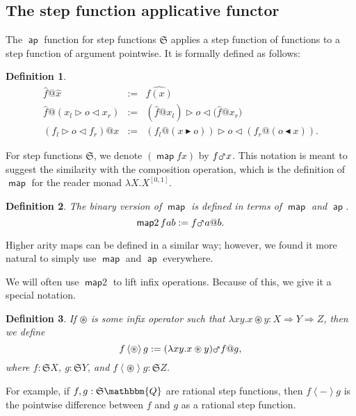 \documentclass{elsarticle}
\makeatletter
\newcommand{\assign}{:=}
\newcommand{\op}[1]{#1}
\newcommand{\tmop}[1]{\ensuremath{\operatorname{#1}}}
\newtheorem{definition}{Definition}
\newcommand{\defEq}{\ensuremath{\assign}}
\newcommand{\pure}[1]{\ensuremath{\widehat{#1}}}
\newcommand{\app}{@}
\newcommand{\Map}{\ensuremath{\mars}}
\newcommand{\maptwo}[1]{\ensuremath{\left\langle #1 \right\rangle}}
\newcommand{\SF}{\ensuremath{\mathfrak{S}}}
\newcommand{\glue}[3]{\ensuremath{#1 \vartriangleright #2 \vartriangleleft #3}}
\newcommand{\splitl}[2]{\ensuremath{#1 \blacktriangleright #2}}
\newcommand{\splitr}[2]{\ensuremath{#2 \blacktriangleleft #1}}
\makeatother
\begin{document}
\subsection{The step function applicative functor}\label{ss:SFasAF}The
$\tmop{\mathsf{ap}}$ function for
step functions $\mathfrak{S}$ applies a step function of functions to a step
function of argument pointwise. It is formally defined as follows:
\begin{definition}
  \begin{eqnarray*}
    \pure{f} \app \pure{x} & \defEq & \pure{f (x)}\\
    \pure{f} \app ( \glue{x_l}{o}{x_r}) & \defEq & \glue{( \pure{f} \app
    x_l)}{o}{( \pure{f} \app x_r})\\
    \glue{(f_l}{o}{f_r)} \app x & \defEq & \glue{(f_l \app (
    \splitl{x}{o}))}{o}{(f_r \app ( \splitr{x}{o}))} \text{.}
  \end{eqnarray*}
\end{definition}

For step functions $\SF$, we denote $( \tmop{\mathsf{map}} f
x)$ by $f \Map x$. This notation is meant to suggest the similarity with the
composition operation, which is the definition of $\tmop{\mathsf{map}}$ for
the reader monad $\lambda X. X^{[0,1]}$.

\begin{definition}
  The binary version of $\tmop{\mathsf{map}}$ is defined in terms of
$\tmop{\mathsf{map}}$
  and $\tmop{\mathsf{ap}}$.
  \[ \tmop{\mathsf{map} 2} f a b \assign f \Map a \app b. \]
\end{definition}

Higher arity maps can be defined in a similar way; however, we found it more
natural to simply use $\tmop{\mathsf{map}}$ and $\tmop{\mathsf{ap}}$
everywhere.

We will often use $\tmop{\mathsf{map} 2}$ to lift infix operations. Because of
this, we give it a special notation.

\begin{definition}
  If $\circledast$ is some infix operator such that $\lambda x
  y. x \circledast y : X \Rightarrow Y \Rightarrow Z$, then we define
  \[ f \maptwo{\circledast} g \assign (\lambda x y.x \circledast y) \Map f
     \app g, \]
  where $f : \SF X$, $g : \SF Y$, and $f \maptwo{\circledast} g : \SF Z$.
\end{definition}

For example, if $f, g : \SF \mathbbm{Q}$ are rational step functions, then $f
\maptwo{\op{-}} g$ is the pointwise difference between $f$ and $g$ as a
rational step function.
\end{document}
